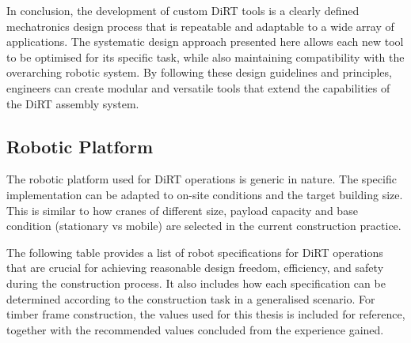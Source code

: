 In conclusion, the development of custom DiRT tools is a clearly defined mechatronics design process that is repeatable and adaptable to a wide array of applications. The systematic design approach presented here allows each new tool to be optimised for its specific task, while also maintaining compatibility with the overarching robotic system. By following these design guidelines and principles, engineers can create modular and versatile tools that extend the capabilities of the DiRT assembly system. 

\subsection{Robotic Platform}

The robotic platform used for DiRT operations is generic in nature. The specific implementation can be adapted to on-site conditions and the target building size. This is similar to how cranes of different size, payload capacity and base condition (stationary vs mobile) are selected in the current construction practice. 

The following table provides a list of robot specifications for DiRT operations that are crucial for achieving reasonable design freedom, efficiency, and safety during the construction process. It also includes how each specification can be determined according to the construction task in a generalised scenario. For timber frame construction, the values used for this thesis is included for reference, together with the recommended values concluded from the experience gained.

